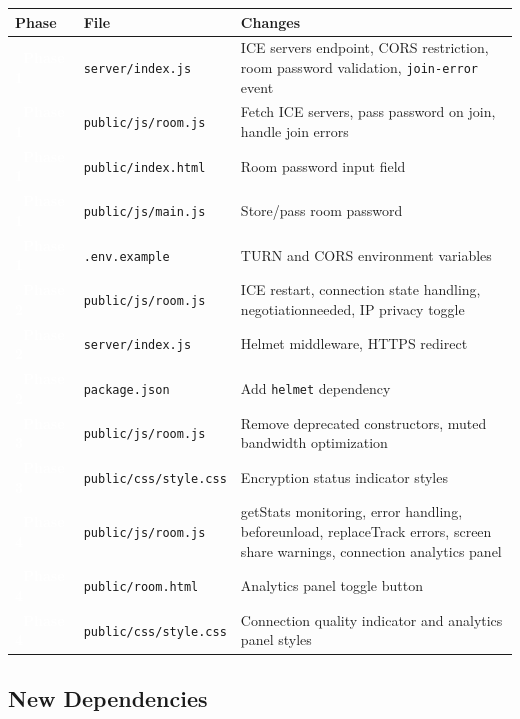\documentclass[11pt,letterpaper]{article}
\newcommand{\phaseone}{\colorbox{critical}{\textcolor{white}{\small\textbf{~Phase 1~}}}}
\newcommand{\phasetwo}{\colorbox{major}{\textcolor{white}{\small\textbf{~Phase 2~}}}}
\newcommand{\phasethree}{\colorbox{minor!80!black}{\textcolor{white}{\small\textbf{~Phase 3~}}}}
\newcommand{\phasefour}{\colorbox{notapplicable}{\textcolor{white}{\small\textbf{~Phase 4~}}}}
\begin{document}
\begin{center}
\begin{tabularx}{\textwidth}{C{1.2cm}L{5cm}L{7cm}}
\toprule
\textbf{Phase} & \textbf{File} & \textbf{Changes} \\
\midrule
{}
\phaseone & \texttt{server/index.js} & ICE servers endpoint, CORS restriction, room password validation, \texttt{join-error} event \\
\phaseone & \texttt{public/js/room.js} & Fetch ICE servers, pass password on join, handle join errors \\
\phaseone & \texttt{public/index.html} & Room password input field \\
\phaseone & \texttt{public/js/main.js} & Store/pass room password \\
\phaseone & \texttt{.env.example} & TURN and CORS environment variables \\
\midrule
{}
\phasetwo & \texttt{public/js/room.js} & ICE restart, connection state handling, negotiationneeded, IP privacy toggle \\
\phasetwo & \texttt{server/index.js} & Helmet middleware, HTTPS redirect \\
\phasetwo & \texttt{package.json} & Add \texttt{helmet} dependency \\
\midrule
{}
\phasethree & \texttt{public/js/room.js} & Remove deprecated constructors, muted bandwidth optimization \\
\phasethree & \texttt{public/css/style.css} & Encryption status indicator styles \\
\midrule
{}
\phasefour & \texttt{public/js/room.js} & getStats monitoring, error handling, beforeunload, replaceTrack errors, screen share warnings, connection analytics panel \\
\phasefour & \texttt{public/room.html} & Analytics panel toggle button \\
\phasefour & \texttt{public/css/style.css} & Connection quality indicator and analytics panel styles \\
\bottomrule
\end{tabularx}
\end{center}

\subsection{New Dependencies}
\end{document}
